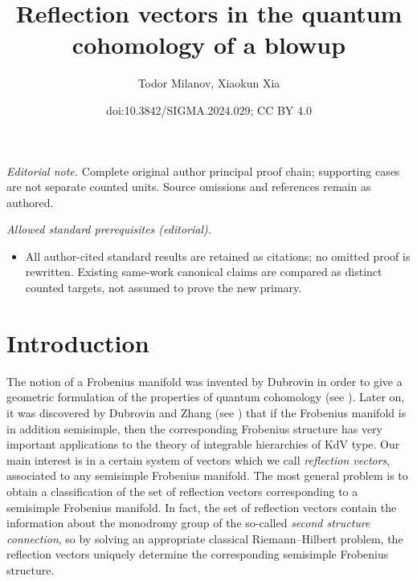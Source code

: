 \documentclass[10pt,a4paper]{article}
\title{Reflection vectors in the quantum cohomology of a blowup}
\author{Todor Milanov, Xiaokun Xia}
\date{doi:10.3842/SIGMA.2024.029; CC BY 4.0}
\numberwithin{equation}{section}
\begin{document}
\maketitle
\noindent\textit{Editorial note.} Complete original author principal proof chain; supporting cases are not separate counted units. Source omissions and references remain as authored.\par\medskip
\noindent\textit{Allowed standard prerequisites (editorial).}\begin{itemize}
\item All author-cited standard results are retained as citations; no omitted proof is rewritten. Existing same-work canonical claims are compared as distinct counted targets, not assumed to prove the new primary.
\end{itemize}\medskip
\section{Introduction}

The notion of a Frobenius manifold was invented by Dubrovin in order
to give a geometric formulation of the properties of quantum
cohomology (see \cite{Du}). Later on, it was discovered by Dubrovin and
Zhang (see \cite{DuZ}) that if the Frobenius manifold is in addition semisimple, then
the corresponding Frobenius structure has very important applications
to the theory of integrable hierarchies of KdV type. Our main interest
is in a certain system of vectors which we call {\em reflection
 vectors}, associated to any semisimple Frobenius manifold. The most general
problem is to obtain a classification of the set of reflection vectors
corresponding to a semisimple Frobenius manifold. In fact, the set of
reflection vectors contain the information about the monodromy group
of the so-called {\em second structure connection}, so by solving an
appropriate classical Riemann--Hilbert problem, the reflection vectors uniquely
determine the corresponding semisimple Frobenius structure.
\end{document}
